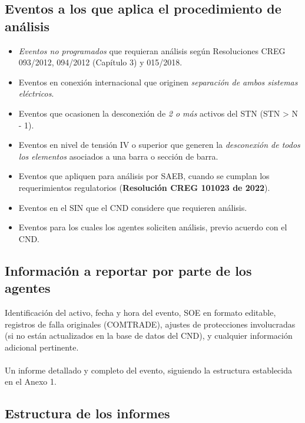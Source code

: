 \documentclass[a5paper]{book}%
\begin{document}
\subsection{Eventos a los que aplica el procedimiento de análisis}

\begin{itemize}
\item\textit{ Eventos no programados} que requieran análisis según Resoluciones CREG 093/2012, 094/2012 (Capítulo 3) y 015/2018.
\item Eventos en conexión internacional que originen \textit{separación de ambos sistemas eléctricos}.
    
\item Eventos que ocasionen la desconexión de \textit{2 o más} activos del STN (STN > N - 1).
    
\item Eventos en nivel de tensión IV o superior que generen la \textit{desconexión de todos los elementos} asociados a una barra o sección de barra.
    
\item Eventos que apliquen para análisis por \ac{SAEB}, cuando se cumplan los requerimientos regulatorios (\textbf{Resolución CREG 101023 de 2022}).
    
\item Eventos en el SIN que el CND considere que requieren análisis.
    
\item Eventos para los cuales los agentes soliciten análisis, previo acuerdo con el CND.

\end{itemize}
    
\subsection{Información a reportar por parte de los agentes}

 Identificación del activo, fecha y hora del evento, \ac{SOE} en formato editable, registros de falla originales (COMTRADE), ajustes de protecciones involucradas (si no están actualizados en la base de datos del CND), y cualquier información adicional pertinente.\\\\
Un informe detallado y completo del evento, siguiendo la estructura establecida en el Anexo 1.

\subsection{Estructura de los informes}
\end{document}
